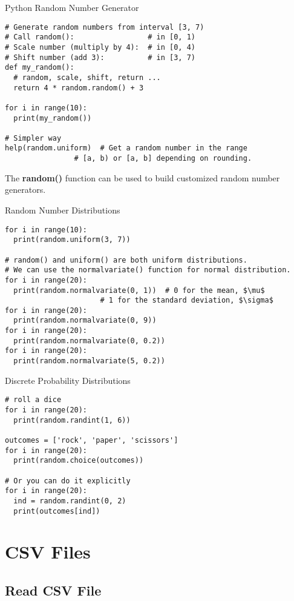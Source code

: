 \documentclass{beamer}
\begin{document}
\begin{frame}[fragile]{Python Random Number Generator}
\begin{verbatim}
# Generate random numbers from interval [3, 7)
# Call random():                 # in [0, 1)
# Scale number (multiply by 4):  # in [0, 4)
# Shift number (add 3):          # in [3, 7)
def my_random():
  # random, scale, shift, return ...
  return 4 * random.random() + 3

for i in range(10):
  print(my_random())

# Simpler way
help(random.uniform)  # Get a random number in the range 
                # [a, b) or [a, b] depending on rounding.
\end{verbatim}
The \textbf{random()} function can be used to build customized 
random number generators.
\end{frame}

\begin{frame}[fragile]{Random Number Distributions}
\begin{verbatim}
for i in range(10):
  print(random.uniform(3, 7))

# random() and uniform() are both uniform distributions.
# We can use the normalvariate() function for normal distribution.
for i in range(20):
  print(random.normalvariate(0, 1))  # 0 for the mean, $\mu$
                      # 1 for the standard deviation, $\sigma$
for i in range(20):
  print(random.normalvariate(0, 9))
for i in range(20):
  print(random.normalvariate(0, 0.2))
for i in range(20):
  print(random.normalvariate(5, 0.2))
\end{verbatim}
\end{frame}

\begin{frame}[fragile]{Discrete Probability Distributions}
\begin{verbatim}
# roll a dice
for i in range(20):
  print(random.randint(1, 6))

outcomes = ['rock', 'paper', 'scissors']
for i in range(20):
  print(random.choice(outcomes))

# Or you can do it explicitly
for i in range(20):
  ind = random.randint(0, 2)
  print(outcomes[ind])
\end{verbatim}
\end{frame}

\section{CSV Files}
\subsection{Read CSV File}
\end{document}
